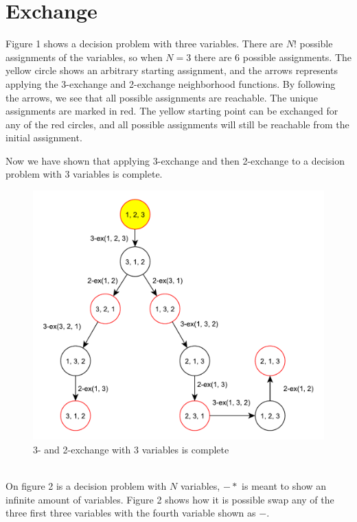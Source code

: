 \section{Exchange}
Figure 1 shows a decision problem with three variables. There are $N!$ possible assignments of the variables, so when $N = 3$ there are $6$ possible assignments. The yellow circle shows an arbitrary starting assignment, and the arrows represents applying the 3-exchange and 2-exchange neighborhood functions. By following the arrows, we see that all possible assignments are reachable. The unique assignments are marked in red. The yellow starting point can be exchanged for any of the red circles, and all possible assignments will still be reachable from the initial assignment.

Now we have shown that applying 3-exchange and then 2-exchange to a decision problem with $3$ variables is complete.\\
\begin{figure}[h]
 \centering
 \includegraphics[width=12cm]{maingraph.pdf}
 \caption{3- and 2-exchange with 3 variables is complete}
 \label{figure:maingraph}
\end{figure}\\
\pagebreak
On figure 2 is a decision problem with $N$ variables, $-*$ is meant to show an infinite amount of variables. Figure 2 shows how it is possible swap any of the three first three variables with the fourth variable shown as $-$.

